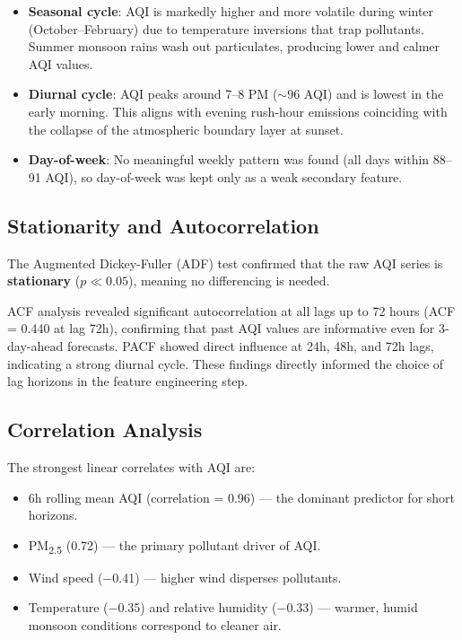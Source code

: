\documentclass[12pt, a4paper]{article}
\begin{document}
\begin{itemize}
  \item \textbf{Seasonal cycle}: AQI is markedly higher and more volatile during winter (October--February) due to temperature inversions that trap pollutants.  Summer monsoon rains wash out particulates, producing lower and calmer AQI values.
  \item \textbf{Diurnal cycle}: AQI peaks around 7--8 PM ($\sim$96 AQI) and is lowest in the early morning.  This aligns with evening rush-hour emissions coinciding with the collapse of the atmospheric boundary layer at sunset.
  \item \textbf{Day-of-week}: No meaningful weekly pattern was found (all days within 88--91 AQI), so day-of-week was kept only as a weak secondary feature.
\end{itemize}

\subsection{Stationarity and Autocorrelation}

The Augmented Dickey-Fuller (ADF) test confirmed that the raw AQI series is \textbf{stationary} ($p \ll 0.05$), meaning no differencing is needed.

ACF analysis revealed significant autocorrelation at all lags up to 72 hours (ACF = 0.440 at lag 72h), confirming that past AQI values are informative even for 3-day-ahead forecasts.  PACF showed direct influence at 24h, 48h, and 72h lags, indicating a strong diurnal cycle.  These findings directly informed the choice of lag horizons in the feature engineering step.

\subsection{Correlation Analysis}

The strongest linear correlates with AQI are:
\begin{itemize}
  \item 6h rolling mean AQI (correlation = 0.96) --- the dominant predictor for short horizons.
  \item PM\textsubscript{2.5} (0.72) --- the primary pollutant driver of AQI.
  \item Wind speed ($-$0.41) --- higher wind disperses pollutants.
  \item Temperature ($-$0.35) and relative humidity ($-$0.33) --- warmer, humid monsoon conditions correspond to cleaner air.
\end{itemize}
\end{document}
